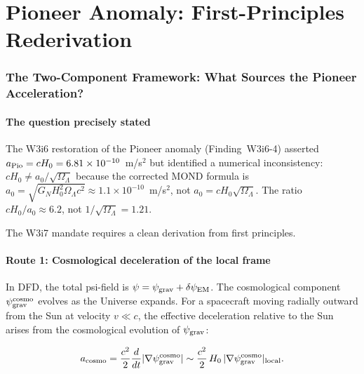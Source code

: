 \documentclass[11pt]{article}
\newcommand{\ee}[1]{\times 10^{#1}}
\newcommand{\psigrav}{\psi_{\rm grav}}
\newcommand{\dpsiEM}{\delta\psi_{\rm EM}}
\newcommand{\Hzero}{H_0}
\newcommand{\aM}{a_0}
\newcommand{\GN}{G_N}
\newcommand{\OmL}{\Omega_\Lambda}
\begin{document}
\part{Pioneer Anomaly: First-Principles Rederivation}
\label{part:Pioneer}

\section{The Two-Component Framework: What Sources the Pioneer Acceleration?}
\label{sec:Pioneer-source}

\subsection{The question precisely stated}

The W3i6 restoration of the Pioneer anomaly (Finding~W3i6-4) asserted
$a_{\rm Pio} = c\Hzero = 6.81\ee{-10}$~m/s$^2$ but identified a numerical
inconsistency: $c\Hzero \neq \aM/\sqrt{\OmL}$ because the corrected MOND
formula is $\aM = \sqrt{\GN\Hzero^2\OmL c^2} \approx 1.1\ee{-10}$~m/s$^2$,
not $\aM = c\Hzero\sqrt{\OmL}$. The ratio $c\Hzero/\aM \approx 6.2$,
not $1/\sqrt{\OmL} = 1.21$.

The W3i7 mandate requires a clean derivation from first principles.

\subsection{Route 1: Cosmological deceleration of the local frame}

In DFD, the total psi-field is $\psi = \psigrav + \dpsiEM$. The
cosmological component $\psigrav^{\rm cosmo}$ evolves as the Universe
expands. For a spacecraft moving radially outward from the Sun at
velocity $v \ll c$, the effective deceleration relative to the Sun
arises from the cosmological evolution of $\psigrav$:

\begin{equation}
a_{\rm cosmo} = \frac{c^2}{2}\frac{d}{dt}|\nabla\psigrav^{\rm cosmo}|
\sim \frac{c^2}{2}\,\Hzero\,|\nabla\psigrav^{\rm cosmo}|_{\rm local}.
\end{equation}
\end{document}
